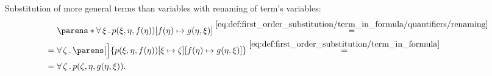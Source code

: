 \begin{example}
\begin{thmenum}
     Substitution of more general terms than variables with renaming of term's variables:
    \begin{align*}
      &\phantom{{}={}}
      \parens*{\qforall \xi p(\xi, \eta, f(\eta))}[f(\eta) \mapsto g(\eta, \xi)]
      \overset {\eqref{eq:def:first_order_substitution/term_in_formula/quantifiers/renaming}} = \\ &=
      \qforall \zeta \parens[\Big]{p(\xi, \eta, f(\eta))[\xi \mapsto \zeta][f(\eta) \mapsto g(\eta, \xi)]}
      \overset {\eqref{eq:def:first_order_substitution/term_in_formula}} = \\ &=
      \qforall \zeta p(\zeta, \eta, g(\eta, \xi)).
    \end{align*}
  \end{thmenum}
\end{example}


